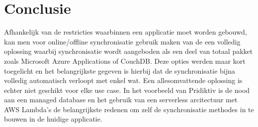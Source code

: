 
\chapter{Conclusie}
\label{ch:conclusie}


Afhankelijk van de restricties waarbinnen een applicatie moet worden gebouwd, kan men voor online/offline synchronisatie gebruik maken van de een volledig oplossing waarbij synchronisatie wordt aangeboden als een deel van totaal pakket zoals Microsoft Azure Applications of CouchDB. Deze opties werden maar kort toegelicht en het belangrijkste gegeven is hierbij dat de synchronisatie bijna volledig automatisch verloopt met enkel wat. Een allesomvattende oplossing is echter niet geschikt voor elke use case. In het voorbeeld van Pridiktiv is de nood aan een managed database en het gebruik van een serverless arcitectuur met AWS Lambda's de belangrijkste redenen om zelf de synchronisatie methodes in te bouwen in de huidige applicatie.

